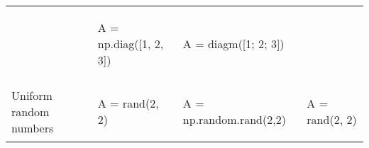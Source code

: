\documentclass[10pt, landscape]{article}
\newenvironment{Shaded}{}{}
\newcommand{\DecValTok}[1]{\textcolor[rgb]{0.25,0.63,0.44}{{#1}}}
\newcommand{\FloatTok}[1]{\textcolor[rgb]{0.25,0.63,0.44}{{#1}}}
\newcommand{\OperatorTok}[1]{\textcolor[rgb]{0.40,0.40,0.40}{{#1}}}
\newcommand{\NormalTok}[1]{{#1}}
\begin{document}
\begin{multicols*}{2}
\begin{table}[ht]
\begin{tabular}[ ]{@{}llll@{}}
\begin{minipage}[t]{0.20\columnwidth}
\begin{Shaded}
\end{Shaded}
\strut
\end{minipage} & \begin{minipage}[t]{0.25\columnwidth}\raggedright\strut
\begin{Shaded}
\begin{Highlighting}[]
\NormalTok{A }\OperatorTok{=} \NormalTok{np.diag([}\DecValTok{1}\NormalTok{, }\DecValTok{2}\NormalTok{, }\DecValTok{3}\NormalTok{])}
\end{Highlighting}
\end{Shaded}
\strut
\end{minipage} & \begin{minipage}[t]{0.20\columnwidth}\raggedright\strut
\begin{Shaded}
\begin{Highlighting}[]
\NormalTok{A = diagm([}\FloatTok{1}\NormalTok{; }\FloatTok{2}\NormalTok{; }\FloatTok{3}\NormalTok{])}
\end{Highlighting}
\end{Shaded}
\strut
\end{minipage}\tabularnewline
\begin{minipage}[t]{0.24\columnwidth}\raggedright\strut
Uniform random numbers\strut
\end{minipage} & \begin{minipage}[t]{0.20\columnwidth}\raggedright\strut
\begin{Shaded}
\begin{Highlighting}[]
\NormalTok{A = rand(}\FloatTok{2}\NormalTok{, }\FloatTok{2}\NormalTok{)}
\end{Highlighting}
\end{Shaded}
\strut
\end{minipage} & \begin{minipage}[t]{0.25\columnwidth}\raggedright\strut
\begin{Shaded}
\begin{Highlighting}[]
\NormalTok{A }\OperatorTok{=} \NormalTok{np.random.rand(}\DecValTok{2}\NormalTok{,}\DecValTok{2}\NormalTok{)}
\end{Highlighting}
\end{Shaded}
\strut
\end{minipage} & \begin{minipage}[t]{0.20\columnwidth}\raggedright\strut
\begin{Shaded}
\begin{Highlighting}[]
\NormalTok{A = rand(}\FloatTok{2}\NormalTok{, }\FloatTok{2}\NormalTok{)}
\end{Highlighting}

\end{Shaded}
\end{minipage}
\end{tabular}
\end{table}
\end{multicols*}
\end{document}
